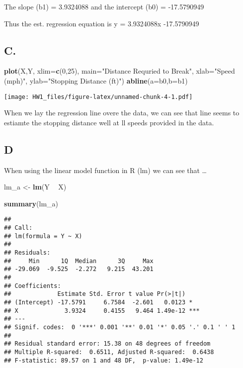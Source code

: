 \documentclass[]{article}
\newenvironment{Shaded}{\begin{snugshade}}{\end{snugshade}}
\newcommand{\DataTypeTok}[1]{\textcolor[rgb]{0.13,0.29,0.53}{#1}}
\newcommand{\DecValTok}[1]{\textcolor[rgb]{0.00,0.00,0.81}{#1}}
\newcommand{\KeywordTok}[1]{\textcolor[rgb]{0.13,0.29,0.53}{\textbf{#1}}}
\newcommand{\NormalTok}[1]{#1}
\newcommand{\OperatorTok}[1]{\textcolor[rgb]{0.81,0.36,0.00}{\textbf{#1}}}
\newcommand{\StringTok}[1]{\textcolor[rgb]{0.31,0.60,0.02}{#1}}
\begin{document}
The slope (b1) = 3.9324088 and the intercept (b0) = -17.5790949

Thus the est. regression equation is y = 3.9324088x -17.5790949

\hypertarget{c.}{%
\subsection{C.}\label{c.}}

\begin{Shaded}
\begin{Highlighting}[]
\KeywordTok{plot}\NormalTok{(X,Y,}
    \DataTypeTok{xlim=}\KeywordTok{c}\NormalTok{(}\DecValTok{0}\NormalTok{,}\DecValTok{25}\NormalTok{), }
    \DataTypeTok{main=}\StringTok{"Distance Requried to Break"}\NormalTok{,}
    \DataTypeTok{xlab=}\StringTok{"Speed (mph)"}\NormalTok{,}
    \DataTypeTok{ylab=}\StringTok{"Stopping Distance (ft)"}\NormalTok{) }
\KeywordTok{abline}\NormalTok{(}\DataTypeTok{a=}\NormalTok{b0,}\DataTypeTok{b=}\NormalTok{b1)  }
\end{Highlighting}
\end{Shaded}

\texttt{[image: HW1\_files/figure-latex/unnamed-chunk-4-1.pdf]}

When we lay the regression line overe the data, we can see that line
seems to estiamte the stopping distance well at ll speeds provided in
the data.

\hypertarget{d-1}{%
\subsection{D}\label{d-1}}

When using the linear model function in R (lm) we can see that \ldots{}

\begin{Shaded}
\begin{Highlighting}[]
\NormalTok{lm_a <-}\StringTok{ }\KeywordTok{lm}\NormalTok{(Y }\OperatorTok{~}\StringTok{ }\NormalTok{X)}

\KeywordTok{summary}\NormalTok{(lm_a)}
\end{Highlighting}
\end{Shaded}

\begin{verbatim}
## 
## Call:
## lm(formula = Y ~ X)
## 
## Residuals:
##     Min      1Q  Median      3Q     Max 
## -29.069  -9.525  -2.272   9.215  43.201 
## 
## Coefficients:
##             Estimate Std. Error t value Pr(>|t|)    
## (Intercept) -17.5791     6.7584  -2.601   0.0123 *  
## X             3.9324     0.4155   9.464 1.49e-12 ***
## ---
## Signif. codes:  0 '***' 0.001 '**' 0.01 '*' 0.05 '.' 0.1 ' ' 1
## 
## Residual standard error: 15.38 on 48 degrees of freedom
## Multiple R-squared:  0.6511, Adjusted R-squared:  0.6438 
## F-statistic: 89.57 on 1 and 48 DF,  p-value: 1.49e-12
\end{verbatim}
\end{document}
